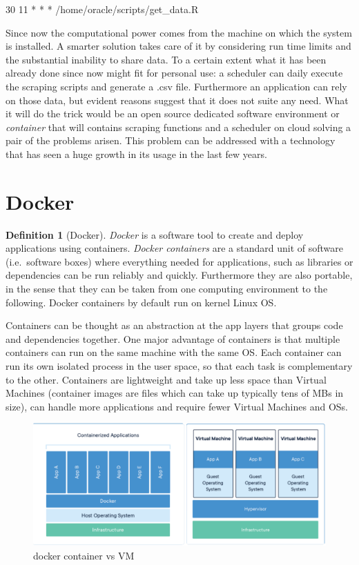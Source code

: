 \documentclass[
  12pt,
  a4paper,
  oneside]{book}
\theoremstyle{definition}
\newtheorem{definition}{Definition}[chapter]
\theoremstyle{definition}
\theoremstyle{definition}
\theoremstyle{remark}
\begin{document}
30 11 * * * /home/oracle/scripts/get\_data.R

Since now the computational power comes from the machine on which the system is installed. A smarter solution takes care of it by considering run time limits and the substantial inability to share data. To a certain extent what it has been already done since now might fit for personal use: a scheduler can daily execute the scraping scripts and generate a .csv file. Furthermore an application can rely on those data, but evident reasons suggest that it does not suite any need. What it will do the trick would be an open source dedicated software environment or \emph{container} that will contains scraping functions and a scheduler on cloud solving a pair of the problems arisen. This problem can be addressed with a technology that has seen a huge growth in its usage in the last few years.

\hypertarget{docker}{%
\section{Docker}\label{docker}}

\begin{definition}[Docker]
\protect\hypertarget{def:docker}{}{\label{def:docker} {} }\emph{Docker} is a software tool to create and deploy applications using containers.
\emph{Docker containers} are a standard unit of software (i.e.~software boxes) where everything needed for applications, such as libraries or dependencies can be run reliably and quickly. Furthermore they are also portable, in the sense that they can be taken from one computing environment to the following. Docker containers by default run on kernel Linux OS.
\end{definition}
Containers can be thought as an abstraction at the app layers that groups code and dependencies together. One major advantage of containers is that multiple containers can run on the same machine with the same OS. Each container can run its own isolated process in the user space, so that each task is complementary to the other. Containers are lightweight and take up less space than Virtual Machines (container images are files which can take up typically tens of MBs in size), can handle more applications and require fewer Virtual Machines and OSs.

\begin{figure}
\centering
\includegraphics{images/dockerVSvirtualmachines.PNG}
\caption{docker container vs VM}
\end{figure}
\end{document}

